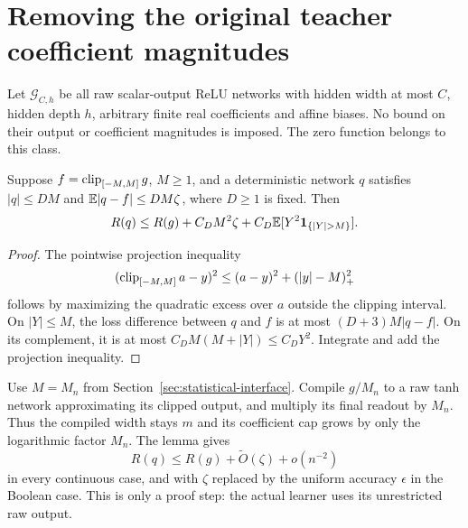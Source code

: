 \section{Removing the original teacher coefficient magnitudes}
\label{sec:width-oracles}
Let $\mathcal G_{C,h}$ be all raw scalar-output ReLU networks with
hidden width at most $C$, hidden depth $h$, arbitrary finite real
coefficients and affine biases. No bound on their output or coefficient
magnitudes is imposed. The zero function belongs to this class.

\begin{lemma}
\label{lem:compiler-risk}
Suppose $f=\operatorname{clip}_{[-M,M]}g$, $M\ge1$, and a deterministic network $q$
satisfies $|q|\le D M$ and
$\mathbb E|q-f|\le D M\zeta$, where $D\ge1$ is fixed. Then
\[
 R(q)\le R(g)+C_D M^2\zeta
                   +C_D\E[Y^2\mathbf1_{\{|Y|>M\}}].
\]
\end{lemma}
\begin{proof}
The pointwise projection inequality
\[
 (\operatorname{clip}_{[-M,M]}a-y)^2\le(a-y)^2+(|y|-M)_+^2
\]
follows by maximizing the quadratic excess over $a$ outside the clipping
interval. On $|Y|\le M$, the loss difference between $q$ and $f$ is at
most $(D+3)M|q-f|$. On its complement, it is at most
$C_D M(M+|Y|)\le C_DY^2$. Integrate and add the projection inequality.
\end{proof}

Use $M=M_n$ from Section~\ref{sec:statistical-interface}. Compile
$g/M_n$ to a raw tanh network approximating its clipped output, and
multiply its final readout by $M_n$. Thus the compiled width stays $m$
and its coefficient cap grows by only the logarithmic factor $M_n$.
The lemma gives
\[
 R(q)\le R(g)+\widetilde O(\zeta)+o(n^{-2})
\]
in every continuous case, and with $\zeta$ replaced by the uniform
accuracy $\epsilon$ in the Boolean case. This is only a proof step:
the actual learner uses its unrestricted raw output.

